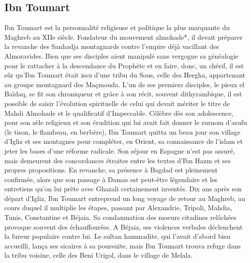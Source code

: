 \subsection{Ibn Toumart}
\label{IbnToumart}


Ibn Toumart est la personnalité religieuse et politique la plus marquante du Maghreb au
XIIe siècle. Fondateur du mouvement almohade*, il devait préparer la revanche des Sanhadja
montagnards contre l’empire déjà vacillant des Almoravides. Bien que ses disciples aient
manipulé sans vergogne sa généalogie pour le rattacher à la descendance du Prophète et en
faire, donc, un chérif, il est sûr qu’Ibn Toumart était issu d’une tribu du Sous, celle des Hergha,
appartenant au groupe montagnard des Maçmouda.
 L’un de ses premiers disciples, le pieux el Baïdaq, se fit son chroniqueur et grâce à son
récit, souvent dithyrambique, il est possible de saisir l’évolution spirituelle de celui qui
devait mériter le titre de Mahdi Almohade et le qualificatif d’Impeccable. Célèbre dès son
adolescence, pour son zèle religieux et son érudition qui lui avait fait donner le surnom d’asufu
(le tison, le flambeau, en berbère), Ibn Toumart quitta un beau jour son village d’Igliz et
ses montagnes pour compléter, en Orient, sa connaissance de l’islam et jeter les bases d’une
réforme radicale.
 Son séjour en Espagne n’est pas assuré, mais demeurent des concordances étroites entre
les textes d’Ibn Hazm et ses propres propositions. En revanche, sa présence à Bagdad est
pleinement confirmée, alors que son passage à Damas est peut-être légendaire et les entretiens
qu’on lui prête avec Ghazali certainement inventés.
 Dix ans après son départ d’Igliz, Ibn Toumart entreprend un long voyage de retour au Maghreb,
au cours duquel il multiplie les étapes, passant par Alexandrie, Tripoli, Mahdia, Tunis,
Constantine et Béjaia. Sa condamnation des moeurs citadines relâchées provoque souvent des
échauffourées. A Béjaia, ses violences verbales déclenchent la fureur populaire contre lui. Le
sultan hammadite, qui l’avait d’abord bien accueilli, lança ses sicaires à sa poursuite, mais Ibn
Toumart trouva refuge dans la tribu voisine, celle des Beni Urigol, dans le village de Melala.
